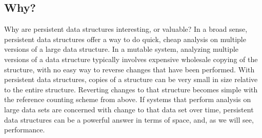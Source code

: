\documentclass[preprint]{sigplanconf}
\begin{document}
\subsection{Why?}
Why are persistent data structures interesting, or valuable?
In a broad sense, persistent data structures offer a way to do quick, cheap analysis on multiple versions of a large data structure.
In a mutable system, analyzing multiple versions of a data structure typically involves expensive wholesale copying of the structure, with no easy way to reverse changes that have been performed.
With persistent data structures, copies of a structure can be very small in size relative to the entire structure.
Reverting changes to that structure becomes simple with the reference counting scheme from above.
If systems that perform analysis on large data sets are concerned with change to that data set over time, persistent data structures can be a powerful answer in terms of space, and, as we will see, performance.
\end{document}

